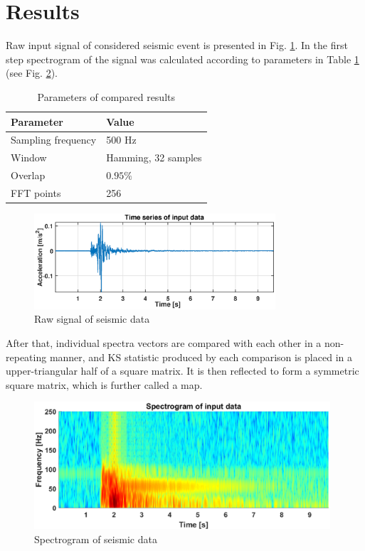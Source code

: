 \documentclass[smallextended]{svjour3}       %
\begin{document}
\section{Results}
Raw input signal of considered seismic event is presented in Fig. \ref{fig: raw}. In the first step spectrogram of the signal was calculated according to parameters in Table \ref{tab:tab} (see Fig. \ref{fig: spec}). 
\begin{table}[ht!]
    \centering
    \caption{Parameters of compared results}
  \begin{tabular}{|l|l|}
    \hline
    \textbf{Parameter} & \textbf{Value} \\ \hline
         Sampling frequency & 500 Hz \\ \hline
         Window & Hamming, 32 samples \\ \hline
         Overlap & $0.95\%$ \\ \hline
         FFT points & 256 \\
    \hline
    \end{tabular}
    \label{tab:tab}
\end{table}

\begin{figure}[ht!]
\centering
\includegraphics[width =0.8\textwidth]{figs/raw}%
\caption{Raw signal of seismic data}
\label{fig: raw}
\end{figure}

After that, individual spectra vectors are compared with each other in a non-repeating manner, and KS statistic produced by each comparison is placed in a upper-triangular half of a square matrix. It is then reflected to form a symmetric square matrix, which is further called a map. 



\begin{figure}[!ht]
\centering
\includegraphics[width = 0.98\textwidth]{figs/spec}
\caption{Spectrogram of seismic data}
\label{fig: spec}
\end{figure}
\end{document}
